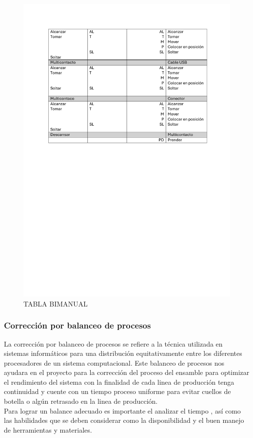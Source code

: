     \begin{figure}[H]
        \centering
        \includegraphics[trim = {20mm 82mm 20mm 25mm},clip,scale=0.45]{9/Img/tablaBimanualTres.pdf}
        \caption{TABLA BIMANUAL }
        \label{fig:bimanual}
    \end{figure}
    
     
    \subsubsection{Corrección por balanceo de procesos}
    La corrección por balanceo de procesos se refiere a la técnica utilizada en sistemas informáticos para una distribución equitativamente entre los diferentes procesadores de un sistema computacional. 
    Este balanceo de procesos nos ayudara en el proyecto para la corrección  del proceso del ensamble para optimizar el rendimiento del sistema con la finalidad de cada linea de producción tenga continuidad y cuente con un tiempo proceso uniforme para evitar cuellos de botella o algún retrasado en la linea de producción.\\
    Para lograr un balance adecuado es importante el analizar el tiempo , así como las habilidades que se deben considerar como la disponibilidad y el buen manejo de herramientas y materiales.
